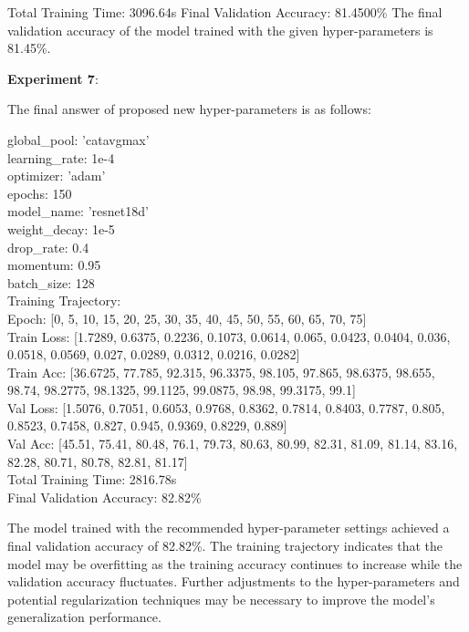 \documentclass{article}
\begin{document}
\begin{tcolorbox}[enhanced jigsaw,breakable,pad at break*=1mm,
  colback=blue!5!white,colframe=blue!75!black,title=GPT-3.5 Experimental Logs,
  watermark color=white]
Total Training Time: 3096.64s \newline
Final Validation Accuracy: 81.4500\% \newline
The final validation accuracy of the model trained with the given hyper-parameters is 81.45\%. \newline

\textbf{Experiment 7}:

The final answer of proposed new hyper-parameters is as follows:

global\_pool: 'catavgmax' \\
learning\_rate: 1e-4 \\
optimizer: 'adam' \\
epochs: 150 \\
model\_name: 'resnet18d' \\
weight\_decay: 1e-5 \\
drop\_rate: 0.4 \\
momentum: 0.95 \\
batch\_size: 128 \\

Training Trajectory:\\
Epoch: [0, 5, 10, 15, 20, 25, 30, 35, 40, 45, 50, 55, 60, 65, 70, 75] \\
Train Loss: [1.7289, 0.6375, 0.2236, 0.1073, 0.0614, 0.065, 0.0423, 0.0404, 0.036, 0.0518, 0.0569, 0.027, 0.0289, 0.0312, 0.0216, 0.0282] \\
Train Acc: [36.6725, 77.785, 92.315, 96.3375, 98.105, 97.865, 98.6375, 98.655, 98.74, 98.2775, 98.1325, 99.1125, 99.0875, 98.98, 99.3175, 99.1] \\
Val Loss: [1.5076, 0.7051, 0.6053, 0.9768, 0.8362, 0.7814, 0.8403, 0.7787, 0.805, 0.8523, 0.7458, 0.827, 0.945, 0.9369, 0.8229, 0.889]  \\
Val Acc: [45.51, 75.41, 80.48, 76.1, 79.73, 80.63, 80.99, 82.31, 81.09, 81.14, 83.16, 82.28, 80.71, 80.78, 82.81, 81.17] \\
Total Training Time: 2816.78s \\
Final Validation Accuracy: 82.82\%

The model trained with the recommended hyper-parameter settings achieved a final validation accuracy of 82.82\%. The training trajectory indicates that the model may be overfitting as the training accuracy continues to increase while the validation accuracy fluctuates. Further adjustments to the hyper-parameters and potential regularization techniques may be necessary to improve the model's generalization performance.


\end{tcolorbox}
\end{document}
